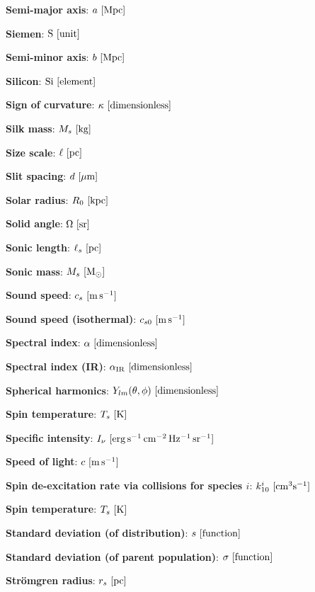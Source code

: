 \documentclass[a4paper,10pt]{article}
\begin{document}
{\noindent}\textbf{Semi-major axis}: $a ~ [{\rm Mpc}]$

{\noindent}\textbf{Siemen}: ${\rm S} ~ [{\rm unit}]$

{\noindent}\textbf{Semi-minor axis}: $b ~ [{\rm Mpc}]$

{\noindent}\textbf{Silicon}: ${\rm Si} ~ [{\rm element}]$

{\noindent}\textbf{Sign of curvature}: $\kappa ~ [{\rm dimensionless}]$

{\noindent}\textbf{Silk mass}: $M_s ~ [{\rm kg}]$

{\noindent}\textbf{Size scale}: $\ell ~ [{\rm pc}]$

{\noindent}\textbf{Slit spacing}: $d ~ [{\rm \mu m}]$

{\noindent}\textbf{Solar radius}: $R_0 ~ [{\rm kpc}]$

{\noindent}\textbf{Solid angle}: $\Omega ~ [{\rm sr}]$

{\noindent}\textbf{Sonic length}: $\ell_s ~ [{\rm pc}]$

{\noindent}\textbf{Sonic mass}: $M_s ~ [{\rm M_\odot}]$

{\noindent}\textbf{Sound speed}: $c_s ~ [{\rm m\,s^{-1}}]$

{\noindent}\textbf{Sound speed (isothermal)}: $c_{s0} ~ [{\rm m\,s^{-1}}]$

{\noindent}\textbf{Spectral index}: $\alpha ~ [{\rm dimensionless}]$

{\noindent}\textbf{Spectral index (IR)}: $\alpha_{\rm IR} ~ [{\rm dimensionless}]$

{\noindent}\textbf{Spherical harmonics}: $Y_{lm}(\theta,\phi) ~ [{\rm dimensionless}]$

{\noindent}\textbf{Spin temperature}: $T_s ~ [{\rm K}]$

{\noindent}\textbf{Specific intensity}: $I_\nu ~ [{\rm erg\,s^{-1}\,cm^{-2}\,Hz^{-1}\,sr^{-1}}]$

{\noindent}\textbf{Speed of light}: $c ~ [{\rm m\,s^{-1}}]$

{\noindent}\textbf{Spin de-excitation rate via collisions for species $i$}: $k_{10}^i ~ [{\rm cm^3s^{-1}}]$

{\noindent}\textbf{Spin temperature}: $T_s ~ [{\rm K}]$

{\noindent}\textbf{Standard deviation (of distribution)}: $s ~ [{\rm function}]$

{\noindent}\textbf{Standard deviation (of parent population)}: $\sigma ~ [{\rm function}]$

{\noindent}\textbf{Str\"omgren radius}: $r_s ~ [{\rm pc}]$
\end{document}
